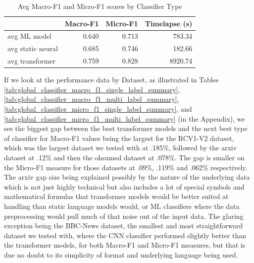 \documentclass[final]{clv2025-revised}
\begin{document}
\begin{table}[h!]
\centering
\small
\caption{Avg Macro-F1 and Micro-F1 scores by Classifier Type} %
\label{tab:summ_avg_macro_micro_f1} %
\begin{tabular}{lrrr} %
\toprule
 & \textbf{Macro-F1} & \textbf{Micro-F1} & \textbf{Timelapse (s)} \\
\midrule
avg ML model        & 0.640 & 0.713 &   783.34 \\
avg static neural   & 0.685 & 0.746 &   182.66 \\
avg transformer     & 0.759 & 0.828 &  8920.74 \\
\bottomrule
\end{tabular}
\end{table}

If we look at the performance data by Dataset, as illustrated in Tables \ref{tab:global_classifier_macro_f1_single_label_summary}, \ref{tab:global_classifier_macro_f1_multi_label_summary}, \ref{tab:global_classifier_micro_f1_single_label_summary}, and \ref{tab:global_classifier_micro_f1_multi_label_summary} (in the Appendix), we see the biggest gap between the best transformer models and the next best type of classifier for Macro-F1 values being the largest for the RCV1-V2 dataset, which was the largest dataset we tested with at .185\%, followed by the arxiv dataset at .12\% and then the ohsumed dataset at .078\%. The gap is smaller on the Micro-F1 measure for those datasets at .09\%, .119\% and .062\% respectively. The arxiv gap size being explained possibly by the nature of the underlying data which is not just highly technical but also includes a lot of special symbols and mathematical formulas that transformer models would be better suited at handling than static language models would, or ML classifiers where the data preprocessing would pull much of that noise out of the input data. The glaring exception being the BBC-News dataset, the smallest and most straightforward dataset we tested with, where the CNN classifier performed slightly better than the transformer models, for both Macro-F1 and Micro-F1 measures, but that is due no doubt to its simplicity of format and underlying language being used. 
\end{document}
